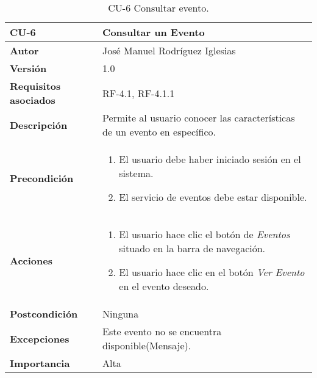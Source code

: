 \begin{table}[h]
	\centering
	\begin{tabularx}{\linewidth}{ p{} p{} }
		\toprule
		\textbf{CU-6}    & \textbf{Consultar un Evento}\\
		\toprule
            \textbf{Autor}                & José Manuel Rodríguez Iglesias \\
		\textbf{Versión}              & 1.0    \\
		\textbf{Requisitos asociados} & RF-4.1, RF-4.1.1 \\
		\textbf{Descripción}          & Permite al usuario conocer las características de un evento en específico. \\
		\textbf{Precondición}         &  
            \begin{enumerate}
			\def\labelenumi{\arabic{enumi}.}
			\tightlist
			\item El usuario debe haber iniciado sesión en el sistema.
			\item El servicio de eventos debe estar disponible.
		\end{enumerate}\\
  
		\textbf{Acciones}             &
		\begin{enumerate}
			\def\labelenumi{\arabic{enumi}.}
			\tightlist
			\item El usuario hace clic el botón de \textit{Eventos} situado en la barra de navegación.
			\item El usuario hace clic en el botón \textit{Ver Evento} en el evento deseado.
		\end{enumerate}\\
		\textbf{Postcondición}        & Ninguna \\
		\textbf{Excepciones}          & Este evento no se encuentra disponible(Mensaje). \\
		\textbf{Importancia}          & Alta\\
		\bottomrule
	\end{tabularx}
	\caption{CU-6 Consultar evento.}
\end{table}

